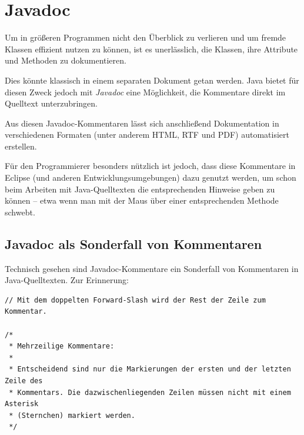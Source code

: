 \chapter{Javadoc}
\renewcommand{\chaptertitle}{Javadoc}

\lehead[]{\normalfont\sffamily\hspace*{-2.00cm}\textcolor{white}{\colorbox{lightblue}{\makebox[1.60cm][r]{\thechapter}}}\hspace{0.17cm}\textcolor{lightblue}{\chaptertitle}}
\rohead[]{\textcolor{lightblue}{\chaptertitle}\normalfont\sffamily\hspace*{0.17cm}\textcolor{white}{\colorbox{lightblue}{\makebox[1.60cm][l]{\thechapter}}}\hspace{-2.00cm}}
\rehead[]{\textcolor{lightblue}{AvHG, Inf, My}}
\lohead[]{\textcolor{lightblue}{AvHG, Inf, My}}

\lstset{style=myJava}

Um in größeren Programmen nicht den Überblick zu verlieren und um fremde
Klassen effizient nutzen zu können, ist es unerlässlich, die Klassen, ihre
Attribute und Methoden zu dokumentieren.

Dies könnte klassisch in einem separaten Dokument getan werden. Java bietet für
diesen Zweck jedoch mit {\em Javadoc} eine Möglichkeit, die Kommentare direkt im
Quelltext unterzubringen.

Aus diesen Javadoc-Kommentaren lässt sich anschließend Dokumentation in
verschiedenen Formaten (unter anderem HTML, RTF und PDF) automatisiert
erstellen.

Für den Programmierer besonders nützlich ist jedoch, dass diese Kommentare in
Eclipse (und anderen Entwicklungsumgebungen) dazu genutzt werden, um schon beim
Arbeiten mit Java-Quelltexten die entsprechenden Hinweise geben zu können --
etwa wenn man mit der Maus über einer entsprechenden Methode schwebt.


\section{Javadoc als Sonderfall von Kommentaren}

Technisch gesehen sind Javadoc-Kommentare ein Sonderfall von Kommentaren in
Java-Quelltexten. Zur Erinnerung:

\begin{lstlisting}
// Mit dem doppelten Forward-Slash wird der Rest der Zeile zum Kommentar.

/* 
 * Mehrzeilige Kommentare:
 *
 * Entscheidend sind nur die Markierungen der ersten und der letzten Zeile des
 * Kommentars. Die dazwischenliegenden Zeilen müssen nicht mit einem Asterisk
 * (Sternchen) markiert werden.
 */
\end{lstlisting}

